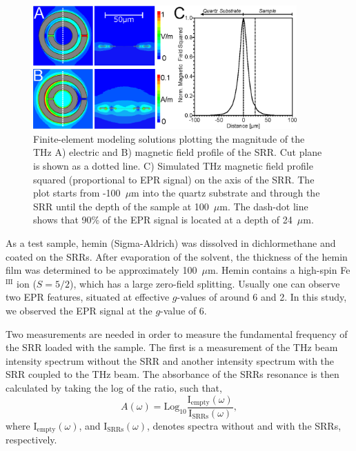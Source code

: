 \begin{figure}[htp]
\centering
  \includegraphics[width=0.9\textwidth]{Kapitel/Ch3-Images/02-AnsoftFields.eps}%
  \caption[Finite-element simulation solutions of SRR geometry.]{Finite-element modeling solutions plotting the magnitude of the THz A) electric and B) magnetic field profile of the SRR. Cut plane is shown as a dotted line. C) Simulated THz magnetic field profile squared (proportional to EPR signal) on the axis of the SRR. The plot starts from -100~$\mu$m into the quartz substrate and  through the SRR until the depth of the sample at 100~$\mu$m. The dash-dot line shows that 90\% of the EPR signal is located at a depth of 24~$\mu$m.}
  \label{ch3-fig:HFSS}
\end{figure}

As a test sample, hemin (Sigma-Aldrich) was dissolved in dichlormethane and coated on the SRRs. After evaporation of the solvent, the thickness of the hemin film was determined to be approximately 100~$\mu$m. Hemin contains a high-spin Fe$^\text{III}$ ion ($S = 5/2$), which has a large zero-field splitting. \cite{Nehrkorn15,Johnson66,Marathe73,Lang66} Usually one can observe two EPR features, situated at effective $g$-values of around 6 and 2. \cite{Pilbrow90} In this study, we observed the EPR signal at the $g$-value of 6. 

Two measurements are needed in order to measure the fundamental frequency of the SRR loaded with the sample. The first is a measurement of the THz beam intensity spectrum without the SRR and another intensity spectrum with the SRR coupled to the THz beam. The absorbance of the SRRs resonance is then calculated by taking the log of the ratio, such that,
\begin{equation}
  A(\omega) = \text{Log}_{10}\frac{\text{I}_{\text{empty}}(\omega)}{\text{I}_{\text{SRRs}}(\omega)},  
\end{equation}
where $\text{I}_{\text{empty}}(\omega)$, and $\text{I}_{\text{SRRs}}(\omega)$, denotes spectra without and with the SRRs, respectively. 

